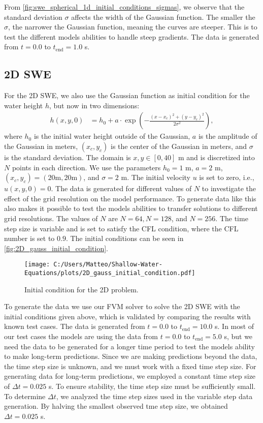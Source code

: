 From \autoref{fig:swe_spherical_1d_initial_conditions_sigmas}, we observe that the standard deviation \(\sigma\) affects the width of the Gaussian function.
The smaller the $\sigma$, the narrower the Gaussian function, meaning the curves are steeper.
This is to test the different models abilities to handle steep gradients.
The data is generated from $t = 0.0$ to $t_{\text{end}} = 1.0$ s.

\subsection*{2D SWE}
For the 2D SWE, we also use the Gaussian function as initial condition for the water height $h$, but now in two dimensions:
\begin{align*}
    h(x,y,0) &= h_0 + a \cdot \exp \left( -\frac{{(x-x_c)}^2 + {(y-y_c)}^2}{2\sigma^2} \right), 
\end{align*}
where $h_0$ is the initial water height outside of the Gaussian, $a$ is the amplitude of the Gaussian in meters, $(x_c, y_c)$ is the center of the Gaussian in meters, and $\sigma$ is the standard deviation.
The domain is $x,y \in [0,40]$ m and is discretized into $N$ points in each direction.
We use the parameters $h_0 = 1$ m, $a = 2$ m, $(x_c, y_c) = (20 \text{m}, 20 \text{m})$, and $\sigma = 2$ m.
The initial velocity $u$ is set to zero, i.e., $u(x,y,0) = 0$.
The data is generated for different values of $N$ to investigate the effect of the grid resolution on the model performance.
To generate data like this also makes it possible to test the models abilities to transfer solutions to different grid resolutions.
The values of $N$ are $N = 64, N = 128$, and $N = 256$.
The time step size is variable and is set to satisfy the CFL condition, where the CFL number is set to $0.9$.
The initial conditions can be seen in \autoref{fig:2D_gauss_initial_condition}.
\begin{figure}[H]
    \centering
    \texttt{[image: C:/Users/Matteo/Shallow-Water-Equations/plots/2D\_gauss\_initial\_condition.pdf]}
    \caption{Initial condition for the 2D problem.}\label{fig:2D_gauss_initial_condition}
\end{figure}
To generate the data we use our FVM solver to solve the 2D SWE with the initial conditions given above, which is validated by comparing the results with known test cases.
The data is generated from $t = 0.0$ to $t_{\text{end}} = 10.0$ s.
In most of our test cases the models are using the data from $t = 0.0$ to $t_{\text{end}} = 5.0$ s, but we need the data to be generated for a longer time period to test the models ability to make long-term predictions.
Since we are making predictions beyond the data, the time step size is unknown, and we must work with a fixed time step size.
For generating data for long-term predictions, we employed a constant time step size of $\Delta t = 0.025$ s.
To ensure stability, the time step size must be sufficiently small.
To determine $\Delta t$, we analyzed the time step sizes used in the variable step data generation. 
By halving the smallest observed tme step size, we obtained $\Delta t = 0.025$ s.



